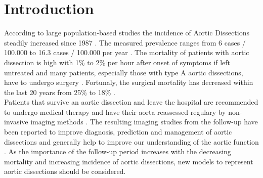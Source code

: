 \documentclass[thesis.tex]{subfiles}
\begin{document}
\chapter{Introduction}
\label{chap:introduction}


According to large population-based studies the incidence of Aortic Dissections steadily increased since 1987 \cite{olsson2007thoracic}. The measured prevalence ranges from 6 cases / 100.000 to 16.3 cases / 100.000 per year \cite{olsson2007thoracic,goldfinger2014thoracic}. The mortality of patients with aortic dissection is high with 1\% to 2\% per hour after onset of symptoms if left untreated \cite{doi:10.1161/CIRCULATIONAHA.117.031264,meszaros2000epidemiology,goldfinger2014thoracic} and many patients, especially those with type A aortic dissections, have to undergo surgery \cite{doi:10.1161/CIRCULATIONAHA.117.031264}.  Fortunaly, the surgical mortality has decreased within the last 20 years from 25\% to 18\% \cite{doi:10.1161/CIRCULATIONAHA.117.031264}. \\
Patients that survive an aortic dissection and leave the hospital are recommended to undergo medical therapy and have their aorta reassessed regulary by non-invasive imaging methods \cite{olsson2007thoracic,desanctis1987aortic,baliga2014role}. The resulting imaging studies from the follow-up have been reported to improve diagnosis, prediction and management of aortic dissections \cite{doi:10.1161/CIRCULATIONAHA.117.031264} and generally help to improve our understanding of the aortic function \cite{baliga2014role}. As the importance of the follow-up period increases with the decreasing mortality and increasing incidence of aortic dissections, new models to represent aortic dissections should be considered. 
\\
\end{document}
